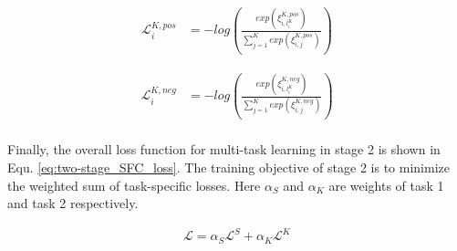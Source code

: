 \documentclass[letterpaper]{article} %
\begin{document}
  \begin{equation}
    \begin{aligned}
      \mathcal{L}^{K,pos}_{i} &= -log(\frac{exp(\xi_{i,l^{K}_{i}}^{K,pos})}{\sum_{j=1}^{K}exp(\xi_{i,j}^{K,pos})})
      \label{eq: pos top-k loss}
    \end{aligned}
  \end{equation}

  \begin{equation}
    \begin{aligned}
      \mathcal{L}^{K,neg}_{i} &= -log(\frac{exp(\xi_{i,l^{K}_{i}}^{K,neg})}{\sum_{j=1}^{K}exp(\xi_{i,j}^{K,neg})}) \\
      \label{eq: neg top-k loss}
    \end{aligned}
  \end{equation}

  Finally,  the  overall  loss  function for multi-task learning in stage 2 is
  shown in Equ. \ref{eq:two-stage_SFC_loss}. The training objective of stage 2 is
  to  minimize  the  weighted  sum  of task-specific losses. Here $\alpha_S$ and
  $\alpha_K$  are  weights  of  task  1  and  task  2  respectively.

  \begin{align}
    \mathcal{L} = \alpha_S \mathcal{L}^S + \alpha_K \mathcal{L}^K
    \label{eq:two-stage_SFC_loss}
  \end{align}
\end{document}
